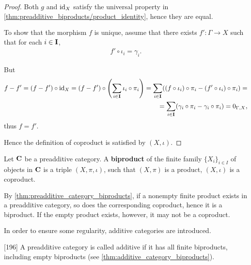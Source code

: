 \begin{proof}
  Both \( g \) and \( \operatorname{id}_X \) satisfy the universal property in \cref{thm:preadditive_biproducts/product_identity}, hence they are equal.

  To show that the morphism \( f \) is unique, assume that there exists \( f': \Gamma \to X \) such that for each \( i \in \operatorname{\mathbf{I}} \),
  \begin{align*}
    f' \circ \iota_i = \gamma_i.
  \end{align*}

  But
  \begin{align*}
    f - f'
    =
    (f - f') \circ \operatorname{id}_X
    =
    (f - f') \circ \left( \sum_{i \in \operatorname{\mathbf{I}}} \iota_i \circ \pi_i \right)
    =
    \sum_{i \in \operatorname{\mathbf{I}}} ((f \circ \iota_i) \circ \pi_i - (f' \circ \iota_i) \circ \pi_i)
    = \\ =
    \sum_{i \in \operatorname{\mathbf{I}}} (\gamma_i \circ \pi_i - \gamma_i \circ \pi_i)
    =
    0_{\Gamma,X},
  \end{align*}
  thus \( f = f' \).

  Hence the definition of coproduct is satisfied by \( (X, \iota) \).
\end{proof}

\begin{definition}\label{def:categorical_biproduct}
  Let \( \operatorname{\mathbf{C}} \) be a preadditive category. A \textbf{biproduct} of the finite family \( \{ X_i \}_{i \in I} \) of objects in \( \operatorname{\mathbf{C}} \) is a triple \( (X, \pi, \iota) \), such that \( (X, \pi) \) is a product, \( (X, \iota) \) is a coproduct.
\end{definition}

\begin{note}\label{note:preadditive_category_biproducts}
  By \cref{thm:preadditive_category_biproducts}, if a nonempty finite product exists in a preadditive category, so does the corresponding coproduct, hence it is a biproduct. If the empty product exists, however, it may not be a coproduct.

  In order to ensure some regularity, additive categories are introduced.
\end{note}

\begin{definition}\label{def:additive_category}\cite{MacLane1994}[196]
  A preadditive category is called additive if it has all finite biproducts, including empty biproducts (see \cref{thm:additive_category_biproducts}).
\end{definition}

